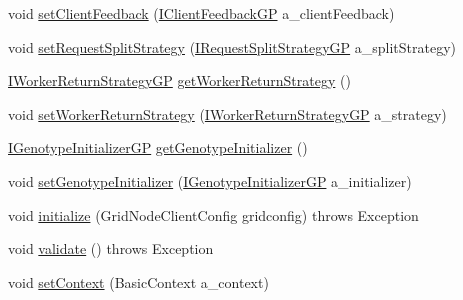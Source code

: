 \begin{DoxyCompactItemize}
\item 
void \hyperlink{interfaceorg_1_1jgap_1_1distr_1_1grid_1_1gp_1_1_i_grid_configuration_g_p_ac5fac4d0eec7dd0ef3f4b8ff62d6a41c}{set\-Client\-Feedback} (\hyperlink{interfaceorg_1_1jgap_1_1distr_1_1grid_1_1gp_1_1_i_client_feedback_g_p}{I\-Client\-Feedback\-G\-P} a\-\_\-client\-Feedback)
\item 
void \hyperlink{interfaceorg_1_1jgap_1_1distr_1_1grid_1_1gp_1_1_i_grid_configuration_g_p_a04d80993d2478afd5472940cc82755d7}{set\-Request\-Split\-Strategy} (\hyperlink{interfaceorg_1_1jgap_1_1distr_1_1grid_1_1gp_1_1_i_request_split_strategy_g_p}{I\-Request\-Split\-Strategy\-G\-P} a\-\_\-split\-Strategy)
\item 
\hyperlink{interfaceorg_1_1jgap_1_1distr_1_1grid_1_1gp_1_1_i_worker_return_strategy_g_p}{I\-Worker\-Return\-Strategy\-G\-P} \hyperlink{interfaceorg_1_1jgap_1_1distr_1_1grid_1_1gp_1_1_i_grid_configuration_g_p_a3c5c98751cf13a4a6b889b59bf1e3dbf}{get\-Worker\-Return\-Strategy} ()
\item 
void \hyperlink{interfaceorg_1_1jgap_1_1distr_1_1grid_1_1gp_1_1_i_grid_configuration_g_p_a57a428501fe9e57754c2a36d14579d20}{set\-Worker\-Return\-Strategy} (\hyperlink{interfaceorg_1_1jgap_1_1distr_1_1grid_1_1gp_1_1_i_worker_return_strategy_g_p}{I\-Worker\-Return\-Strategy\-G\-P} a\-\_\-strategy)
\item 
\hyperlink{interfaceorg_1_1jgap_1_1distr_1_1grid_1_1gp_1_1_i_genotype_initializer_g_p}{I\-Genotype\-Initializer\-G\-P} \hyperlink{interfaceorg_1_1jgap_1_1distr_1_1grid_1_1gp_1_1_i_grid_configuration_g_p_a046a3647abbf0522ce21c41afab82b99}{get\-Genotype\-Initializer} ()
\item 
void \hyperlink{interfaceorg_1_1jgap_1_1distr_1_1grid_1_1gp_1_1_i_grid_configuration_g_p_af857b4cec419d609f5133c35c7e61fc4}{set\-Genotype\-Initializer} (\hyperlink{interfaceorg_1_1jgap_1_1distr_1_1grid_1_1gp_1_1_i_genotype_initializer_g_p}{I\-Genotype\-Initializer\-G\-P} a\-\_\-initializer)
\item 
void \hyperlink{interfaceorg_1_1jgap_1_1distr_1_1grid_1_1gp_1_1_i_grid_configuration_g_p_a7556c270e95fccf7b850017a1ef6f438}{initialize} (Grid\-Node\-Client\-Config gridconfig)  throws Exception
\item 
void \hyperlink{interfaceorg_1_1jgap_1_1distr_1_1grid_1_1gp_1_1_i_grid_configuration_g_p_a771cae4afd11607bbed66d4ab58fd46c}{validate} ()  throws Exception
\item 
void \hyperlink{interfaceorg_1_1jgap_1_1distr_1_1grid_1_1gp_1_1_i_grid_configuration_g_p_a5ad8bdfc5aa8eebc59b1df627466c14c}{set\-Context} (Basic\-Context a\-\_\-context)

\end{DoxyCompactItemize}
